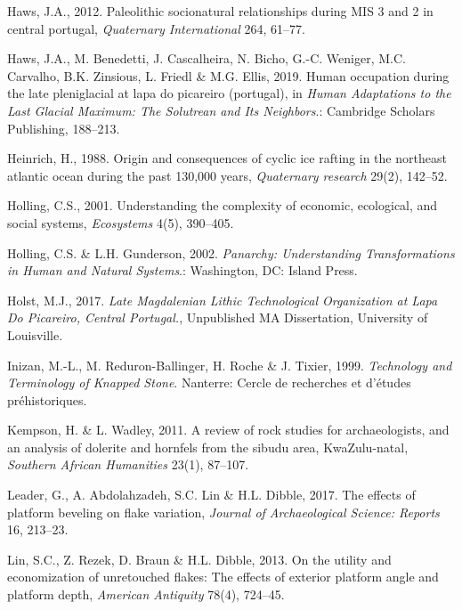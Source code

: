 \documentclass[12pt,twoside]{reedthesis}
\begin{document}
\leavevmode\hypertarget{ref-haws2012}{}%
Haws, J.A., 2012. Paleolithic socionatural relationships during MIS 3 and 2 in central portugal, \emph{Quaternary International} 264, 61--77.

\leavevmode\hypertarget{ref-hawsetal2019}{}%
Haws, J.A., M. Benedetti, J. Cascalheira, N. Bicho, G.-C. Weniger, M.C. Carvalho, B.K. Zinsious, L. Friedl \& M.G. Ellis, 2019. Human occupation during the late pleniglacial at lapa do picareiro (portugal), in \emph{Human Adaptations to the Last Glacial Maximum: The Solutrean and Its Neighbors}.: Cambridge Scholars Publishing, 188--213.

\leavevmode\hypertarget{ref-heinrich1988}{}%
Heinrich, H., 1988. Origin and consequences of cyclic ice rafting in the northeast atlantic ocean during the past 130,000 years, \emph{Quaternary research} 29(2), 142--52.

\leavevmode\hypertarget{ref-holling2001}{}%
Holling, C.S., 2001. Understanding the complexity of economic, ecological, and social systems, \emph{Ecosystems} 4(5), 390--405.

\leavevmode\hypertarget{ref-holling2002}{}%
Holling, C.S. \& L.H. Gunderson, 2002. \emph{Panarchy: Understanding Transformations in Human and Natural Systems}.: Washington, DC: Island Press.

\leavevmode\hypertarget{ref-holst2017}{}%
Holst, M.J., 2017. \emph{\textup{Late Magdalenian Lithic Technological Organization at Lapa Do Picareiro, Central Portugal.}}, Unpublished MA Dissertation, University of Louisville.

\leavevmode\hypertarget{ref-inizan1999}{}%
Inizan, M.-L., M. Reduron-Ballinger, H. Roche \& J. Tixier, 1999. \emph{Technology and Terminology of Knapped Stone}. Nanterre: Cercle de recherches et d'études préhistoriques.

\leavevmode\hypertarget{ref-kempson2011}{}%
Kempson, H. \& L. Wadley, 2011. A review of rock studies for archaeologists, and an analysis of dolerite and hornfels from the sibudu area, KwaZulu-natal, \emph{Southern African Humanities} 23(1), 87--107.

\leavevmode\hypertarget{ref-leader2017}{}%
Leader, G., A. Abdolahzadeh, S.C. Lin \& H.L. Dibble, 2017. The effects of platform beveling on flake variation, \emph{Journal of Archaeological Science: Reports} 16, 213--23.

\leavevmode\hypertarget{ref-linetal2013}{}%
Lin, S.C., Z. Rezek, D. Braun \& H.L. Dibble, 2013. On the utility and economization of unretouched flakes: The effects of exterior platform angle and platform depth, \emph{American Antiquity} 78(4), 724--45.
\end{document}
